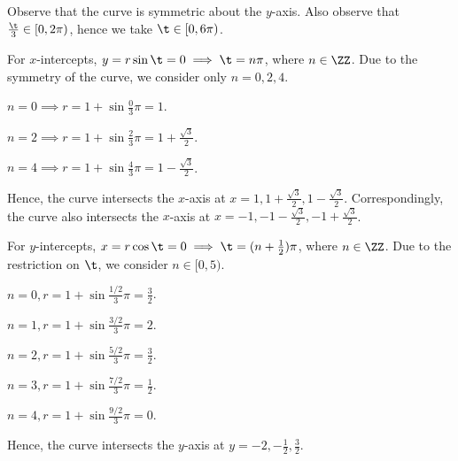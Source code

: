 \begin{solution}
    Observe that the curve is symmetric about the $y$-axis. Also observe that $\frac\t3 \in [0, 2\pi)$, hence we take $\t \in [0, 6\pi)$.
        
    For $x$-intercepts, $y = r\sin\t = 0 \implies \t = n\pi$, where $n \in \ZZ$. Due to the symmetry of the curve, we consider only $n = 0, 2, 4$.

     $n = 0 \implies r = 1 + \sin\frac03\pi = 1$.
    
     $n = 2 \implies r = 1 + \sin\frac23\pi = 1 + \frac{\sqrt3}2$.
        
     $n = 4 \implies r = 1 + \sin\frac43\pi = 1 - \frac{\sqrt3}2$.

    Hence, the curve intersects the $x$-axis at $x = 1, 1 + \frac{\sqrt3}2, 1 - \frac{\sqrt3}2$. Correspondingly, the curve also intersects the $x$-axis at $x = -1, -1 - \frac{\sqrt3}2, -1 + \frac{\sqrt3}2$. 

    For $y$-intercepts, $x = r\cos\t = 0 \implies \t = (n + \frac12)\pi$, where $n \in \ZZ$. Due to the restriction on $\t$, we consider $n \in [0, 5)$.

     $n = 0, r = 1 + \sin\frac{1/2}3\pi = \frac32$.

     $n = 1, r = 1 + \sin\frac{3/2}3\pi = 2$.

     $n = 2, r = 1 + \sin\frac{5/2}3\pi = \frac32$.

     $n = 3, r = 1 + \sin\frac{7/2}3\pi = \frac12$.

     $n = 4, r = 1 + \sin\frac{9/2}3\pi = 0$.

    Hence, the curve intersects the $y$-axis at $y = -2, -\frac12, \frac32$.
    
    \begin{center}
\end{center}
\end{solution}
